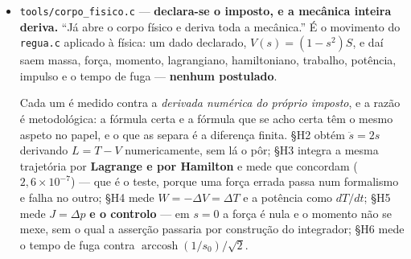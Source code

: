 \documentclass[11pt]{article}
\newcommand{\code}[1]{\texttt{\small #1}}
\theoremstyle{plain}
\theoremstyle{remark}
\begin{document}
\begin{itemize}
\emph{E ele é o par direto/cruzado deste catálogo, por identidade e não por parecença.} Se $s$ é o
direto, $\Pi + s^2 = 1$ \textbf{é} $\cos^2\theta + \sin^2\theta = 1$ --- medido dos dois lados em
§G3 com diferença $10^{-16}$. Logo a \textbf{pressão algébrica é o cruzado ao quadrado}, e
$V = \Pi S$ é o que o cruzado custa. A força $F = 2sS$ é o produto dos dois, e anula-se em $s=0$
(ortogonal) ou em $S=0$ (mesmo campo local): \emph{sem cruzado não há imposto nem força}.

\emph{E a peça que nenhum dos dois estudos tinha, por terem sido escritos separados:} o
\code{paper\_A} diz que para $|s|>1$ a pressão é \textbf{negativa} e chama a $|s|=1$ o
\emph{horizonte}; o \code{polar.c} diz que $\Delta<0$ é o círculo ($\tan$, ilimitada) e $\Delta>0$
a hipérbole ($\tanh$, limitada). \textbf{São a mesma fronteira} --- §G4 mede-a --- e do lado de fora
vive a família real. Os dois chegaram lá por lados opostos.

\emph{As quatro forças.} §G1 integra as quatro equações ($\ddot p = 2p$, $\ddot r$, $\ddot t$,
$\ddot s$) contra a mesma solução fechada e mede que são \textbf{uma}. E §G6 mede o que interessa:
que a mesma equação dá comportamentos \emph{distintos} conforme a configuração --- porque a primeira
versão dessa secção verificava apenas que o sinal de $2sS$ segue o sinal de $s$, que é aritmética e
não medida. Sete asserções, zero falhas.

\item \code{tools/corpo\_fisico.c} --- \textbf{declara-se o imposto, e a mecânica inteira deriva.}
``Já abre o corpo físico e deriva toda a mecânica.'' É o movimento do \code{regua.c} aplicado à
física: um dado declarado, $V(s) = (1-s^2)S$, e daí saem massa, força, momento, lagrangiano,
hamiltoniano, trabalho, potência, impulso e o tempo de fuga --- \textbf{nenhum postulado}.

Cada um é medido contra a \emph{derivada numérica do próprio imposto}, e a razão é metodológica: a
fórmula certa e a fórmula que se acho certa têm o mesmo aspeto no papel, e o que as separa é a
diferença finita. §H2 obtém $\ddot s = 2s$ derivando $L = T - V$ numericamente, sem lá o pôr; §H3
integra a mesma trajetória por \textbf{Lagrange e por Hamilton} e mede que concordam ($2{,}6\times
10^{-7}$) --- que é o teste, porque uma força errada passa num formalismo e falha no outro; §H4
mede $W = -\Delta V = \Delta T$ e a potência como $dT/dt$; §H5 mede $J = \Delta p$ \textbf{e o
controlo} --- em $s=0$ a força é nula e o momento não se mexe, sem o qual a asserção passaria por
construção do integrador; §H6 mede o tempo de fuga contra
$\operatorname{arccosh}(1/s_0)/\sqrt2$.


\end{itemize}
\end{document}

